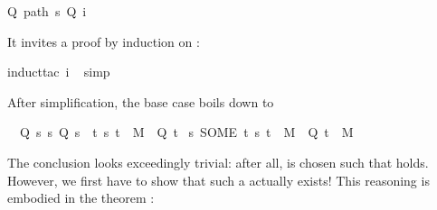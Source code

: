 \begin{isabellebody}
\begin{isamarkuptxt}
\begin{isabelle}
Q\ {}path\ s\ Q\ i{}%
\end{isabelle}
It invites a proof by induction on :%
\end{isamarkuptxt}%
\isamarkuptrue%
\isamarkupfalse%
{}induct{}tac\ i{}\isanewline
\ \isamarkupfalse%
{}simp{}%
\begin{isamarkuptxt}%
\noindent
After simplification, the base case boils down to
\begin{isabelle}%
\ {}{}\ {}Q\ s{}\ {}s{}\ Q\ s\ {}\ {}{}t{}\ {}s{}\ t{}\ {}\ M\ {}\ Q\ t{}{}\isanewline
{}\ {}s{}\ SOME\ t{}\ {}s{}\ t{}\ {}\ M\ {}\ Q\ t{}\ {}\ M%
\end{isabelle}
The conclusion looks exceedingly trivial: after all,  is chosen such that 
holds. However, we first have to show that such a  actually exists! This reasoning
is embodied in the theorem :

\end{isamarkuptxt}
\end{isabellebody}
